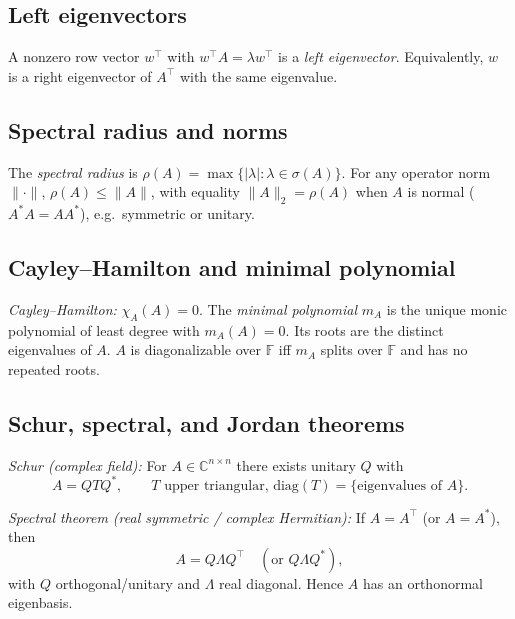 \documentclass[12pt,a4paper]{article}
\theoremstyle{plain}
\theoremstyle{definition}
\theoremstyle{remark}
\theoremstyle{remark}
\begin{document}
	\smallskip
	
	\subsection*{Left eigenvectors}
	
	A nonzero row vector $w^\top$ with $w^\top A=\lambda w^\top$ is a \emph{left eigenvector}.
	Equivalently, $w$ is a right eigenvector of $A^\top$ with the same eigenvalue.
	
	\smallskip
	
	\subsection*{Spectral radius and norms}
	
	The \emph{spectral radius} is $\rho(A)=\max\{|\lambda|:\lambda\in\sigma(A)\}$.
	For any operator norm $\|\cdot\|$, $\rho(A)\le \|A\|$, with equality $\|A\|_2=\rho(A)$ when $A$ is normal
	($A^*A=AA^*$), e.g.\ symmetric or unitary.
	
	\smallskip
	
	\subsection*{Cayley--Hamilton and minimal polynomial}
	
	\emph{Cayley--Hamilton:} $\chi_A(A)=0$.
	The \emph{minimal polynomial} $m_A$ is the unique monic polynomial of least degree with $m_A(A)=0$.
	Its roots are the distinct eigenvalues of $A$.
	$A$ is diagonalizable over $\mathbb{F}$ iff $m_A$ splits over $\mathbb{F}$ and has no repeated roots.
	
	\smallskip
	
	\subsection*{Schur, spectral, and Jordan theorems}
	
	\emph{Schur (complex field):} For $A\in\mathbb{C}^{n\times n}$ there exists unitary $Q$ with
	\[
	A=Q T Q^*, \qquad T \text{ upper triangular, diag}(T)=\{\text{eigenvalues of }A\}.
	\]
	
	\smallskip
	
	\emph{Spectral theorem (real symmetric / complex Hermitian):}
	If $A=A^\top$ (or $A=A^*$), then
	\[
	A=Q \Lambda Q^\top \quad (\text{or } Q \Lambda Q^*),
	\]
	with $Q$ orthogonal/unitary and $\Lambda$ real diagonal. Hence $A$ has an orthonormal eigenbasis.
	
\end{document}
